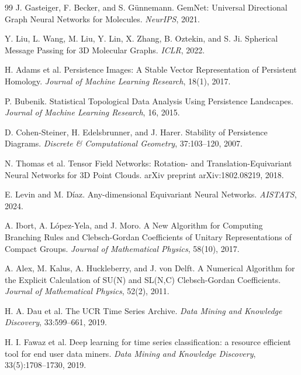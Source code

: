 \documentclass[a4paper,11pt]{article}
\begin{document}
\begin{thebibliography}{99}
J. Gasteiger, F. Becker, and S. G\"unnemann.
\newblock GemNet: Universal Directional Graph Neural Networks for Molecules.
\newblock \emph{NeurIPS}, 2021.

Y. Liu, L. Wang, M. Liu, Y. Lin, X. Zhang, B. Oztekin, and S. Ji.
\newblock Spherical Message Passing for 3D Molecular Graphs.
\newblock \emph{ICLR}, 2022.

H. Adams et al.
\newblock Persistence Images: A Stable Vector Representation of Persistent Homology.
\newblock \emph{Journal of Machine Learning Research}, 18(1), 2017.

P. Bubenik.
\newblock Statistical Topological Data Analysis Using Persistence Landscapes.
\newblock \emph{Journal of Machine Learning Research}, 16, 2015.

D. Cohen-Steiner, H. Edelsbrunner, and J. Harer.
\newblock Stability of Persistence Diagrams.
\newblock \emph{Discrete \& Computational Geometry}, 37:103--120, 2007.

N. Thomas et al.
\newblock Tensor Field Networks: Rotation- and Translation-Equivariant Neural Networks for 3D Point Clouds.
\newblock arXiv preprint arXiv:1802.08219, 2018.

E. Levin and M. D\'iaz.
\newblock Any-dimensional Equivariant Neural Networks.
\newblock \emph{AISTATS}, 2024.

A. Ibort, A. L\'opez-Yela, and J. Moro.
\newblock A New Algorithm for Computing Branching Rules and Clebsch-Gordan Coefficients of Unitary Representations of Compact Groups.
\newblock \emph{Journal of Mathematical Physics}, 58(10), 2017.

A. Alex, M. Kalus, A. Huckleberry, and J. von Delft.
\newblock A Numerical Algorithm for the Explicit Calculation of SU(N) and SL(N,C) Clebsch-Gordan Coefficients.
\newblock \emph{Journal of Mathematical Physics}, 52(2), 2011.

H. A. Dau et al.
\newblock The UCR Time Series Archive.
\newblock \emph{Data Mining and Knowledge Discovery}, 33:599--661, 2019.

H. I. Fawaz et al.
\newblock Deep learning for time series classification: a resource efficient tool for end user data miners.
\newblock \emph{Data Mining and Knowledge Discovery}, 33(5):1708--1730, 2019.


\end{thebibliography}
\end{document}
